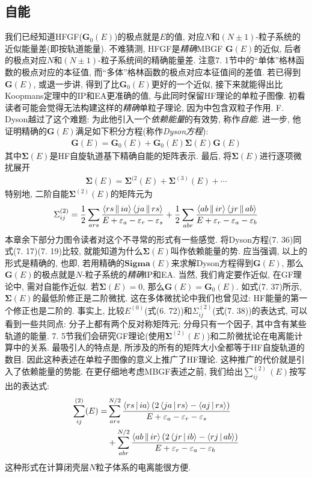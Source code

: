 \subsection{自能}
我们已经知道HFGF($\mathbf{G}_0(E)$)的极点就是$E$的值, 
对应$N$和$(N\pm1)$-粒子系统的近似能量差(即按轨道能量). 
不难猜测, 
HFGF是\emph{精确}MBGF $\mathbf{G}(E)$的近似, 
后者的极点对应$N$和$(N\pm1)$-粒子系统间的精确能量差. 
注意7.
1节中的“单体”格林函数的极点对应\ha 的本征值, 
而“多体”格林函数的极点对应本征值间的差值. 
若已得到$\mathbf{G}(E)$, 
或退一步讲, 
得到了比$\mathbf{G}_0(E)$更好的一个近似, 
接下来就能得出比Koopmans定理中的IP和EA更准确的值, 
与此同时保留HF理论的单粒子图像. 
初看读者可能会觉得无法构建这样的\emph{精确}单粒子理论, 
因为\ha 中包含双粒子作用. 
F. 
Dyson越过了这个难题: 为此他引入一个\emph{依赖能量}的有效势, 
称作\emph{自能}. 
进一步, 
他证明精确的$\mathbf{G}(E)$满足如下积分方程(称作\emph{Dyson方程}):
\begin{align}
\mathbf{G}(E) = \mathbf{G}_0(E) + \mathbf{G}_0(E)\mathbf{\Sigma}(E)\mathbf{G}(E) 
\end{align}
其中$\mathbf{\Sigma}(E)$是HF自旋轨道基下精确自能的矩阵表示. 
最后, 
将$\mathbf{\Sigma}(E)$进行逐项微扰展开
\begin{align}
\mathbf{\Sigma}(E) = \mathbf{\Sigma}^{(2}(E) + \mathbf{\Sigma}^{(3)}(E) + \cdots
\end{align}
特别地, 
二阶自能$\mathbf{\Sigma}^{(2)}(E)$的矩阵元为
\begin{align}
\Sigma_{ij}^{(2)} = \frac{1}{2}\sum_{ars}\frac{\Braket{rs||ia}\Braket{ja||rs}}{E+\varepsilon_a-\varepsilon_r-\varepsilon_s} + 
\frac{1}{2}\sum_{abr}\frac{\Braket{ab||ir}\Braket{jr||ab}}{E+\varepsilon_r-\varepsilon_a-\varepsilon_b}
\end{align}
本章余下部分力图令读者对这个不寻常的形式有一些感觉. 
将Dyson方程(7.
36)同式(7.
17)(7.
19)比较, 
就能知道为什么$\mathbf{\Sigma}(E)$叫作依赖能量的势. 
应当强调, 
以上的形式是精确的, 
也即, 
若用精确的$\mathbf{Sigma}(E)$来求解Dyson方程得到$\mathbf{G}(E)$, 
那么$\mathbf{G}(E)$的极点就是$N$-粒子系统的\emph{精确}IP和EA. 
当然, 
我们肯定要作近似, 
在GF理论中, 
需对自能作近似. 
若$\mathbf{\Sigma}(E)=0$, 
那么$\mathbf{G}(E)=\mathbf{G}_0(E)$. 
如式(7.
37)所示, 
$\mathbf{\Sigma}(E)$的最低阶修正是二阶微扰. 
这在多体微扰论中我们也曾见过: HF能量的第一个修正也是二阶的. 
事实上, 
比较$E^{(0)}$(式(6.
72))和$\Sigma_{ij}^{(2)}$(式(7.
38))的表达式, 
可以看到一些共同点: 分子上都有两个反对称矩阵元; 
分母只有一个因子, 
其中含有某些轨道的能量. 
7.
5节我们会研究GF理论(使用$\mathbf{\Sigma}^{(2)}(E)$)和二阶微扰论在电离能计算中的关系. 
最吸引人的特点是, 
所涉及的所有的矩阵大小全都等于HF自旋轨道的数目. 
因此这种表述在单粒子图像的意义上推广了HF理论. 
这种推广的代价就是引入了依赖能量的势能. 
在更仔细地考虑MBGF表述之前, 
我们给出$\sum_{ij}^{(2)}(E)$按写出的表达式:
\begin{align}
\sum_{ij}^{(2)}(E) = & \sum_{ars}^{N/2} \frac{\Braket{rs|ia}(2\Braket{ja|rs}-\Braket{aj|rs})}{E+\varepsilon_a-\varepsilon_r-\varepsilon_s}\notag\\
                     & + \sum_{abr}^{N/2}\frac{\Braket{ab||ir}(2\Braket{jr|ib}-\Braket{rj|ab})}{E+\varepsilon_r-\varepsilon_a-\varepsilon_b}
\end{align}
这种形式在计算闭壳层$N$粒子体系的电离能很方便.

